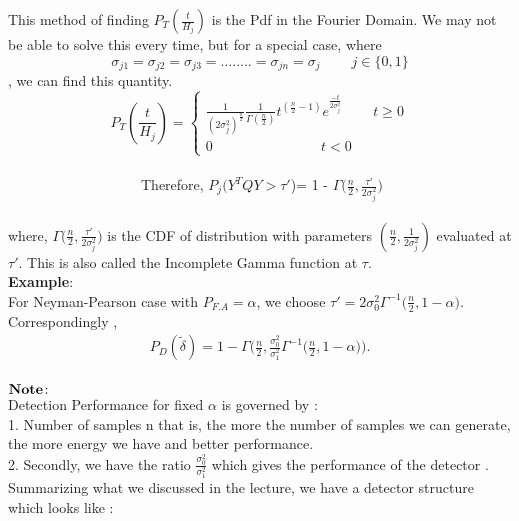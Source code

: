 \documentclass[a4paper,english,12pt]{article}
\begin{document}
 This method of finding $P_T(\frac{t}{H_j})$ is the Pdf in the Fourier Domain. We may not be able to solve this every time, but for a special case, where
 \begin{equation*}
 \sigma_{j1}=\sigma_{j2}=\sigma_{j3}=........=\sigma_{jn}=\sigma_{j} \ \ \ \ \ \ \ \ \ \ j\in\{0,1\}
 \end{equation*} , we can find this quantity.\\
 \begin{equation*}
 P_T(\frac{t}{H_j})=
 \begin{cases}
 	\frac{1}{(2\sigma_j^2)^\frac{n}{2}}\frac{1}{\Gamma(\frac{n}{2})}t^{(\frac{n}{2}-1)}e^\frac{-t}{2\sigma_j^2} \ \ \ \ \ \ \ \ \ \ t\ge0\\
 	0 \ \ \ \ \ \ \ \ \ \ \ \ \ \ \ \ \ \ \ \ \ \ \ \ \ \ \ \ \ \ \ \ \ \ \ t<0
 	\end{cases}
 	\end{equation*}\\
 	\ \ \ \ \ \ \ \ \ \ \ \ \ \ \ \ \ \ \ Therefore, $P_j(Y^TQY>\tau'$)= 1 - $\Gamma\bigg(\frac{n}{2},\frac{\tau'}{2\sigma_j^2}\bigg)$\\
 	\\where, $\Gamma\bigg(\frac{n}{2},\frac{\tau'}{2\sigma_j^2}\bigg)$ is the CDF of  distribution with parameters $(\frac{n}{2},\frac{1}{2\sigma_j^2})$ evaluated at $\tau'$. This is also called the Incomplete Gamma function at $\tau$.
 	\\\textbf{Example}:\\
 	For Neyman-Pearson case with $P_{F.A}=\alpha$, we choose $\tau'= 2\sigma_{0}^{2}\Gamma^{-1}\bigg(\frac{n}{2},1-\alpha\bigg)$.
 	\\Correspondingly ,\\
 	\begin{align*}
 	P_D(\tilde{\delta})=1 - \Gamma\bigg(\frac{n}{2},\frac{\sigma_0^2}{\sigma_1^2}\Gamma^{-1}\bigg(\frac{n}{2},1-\alpha\bigg)\bigg).
 \end{align*}\\
 $\\\textbf{Note}\colon$\\
 Detection Performance for fixed $\alpha$ is governed by :\\
 1. Number of samples n that is, the more the number of samples we can generate, the more energy we have and better performance.\\
 2. Secondly, we have the ratio $\frac{\sigma_0^2}{\sigma_1^2}$ which gives the performance of the detector .
 \\ Summarizing what we discussed in the lecture, we have a detector structure which looks like :\\
\end{document}
